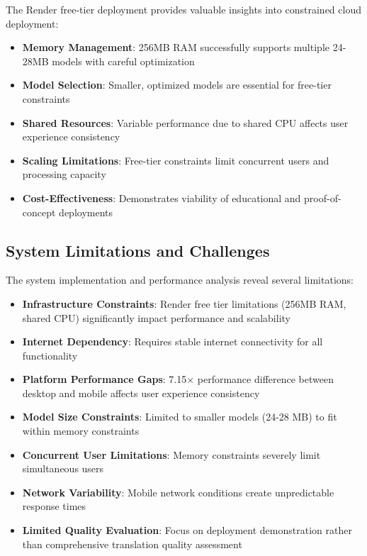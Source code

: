 \documentclass[conference]{IEEEtran}
\begin{document}
The Render free-tier deployment provides valuable insights into constrained cloud deployment:

\begin{itemize}
    \item \textbf{Memory Management}: 256MB RAM successfully supports multiple 24-28MB models with careful optimization
    \item \textbf{Model Selection}: Smaller, optimized models are essential for free-tier constraints
    \item \textbf{Shared Resources}: Variable performance due to shared CPU affects user experience consistency
    \item \textbf{Scaling Limitations}: Free-tier constraints limit concurrent users and processing capacity
    \item \textbf{Cost-Effectiveness}: Demonstrates viability of educational and proof-of-concept deployments
\end{itemize}

\subsection{System Limitations and Challenges}

The system implementation and performance analysis reveal several limitations:

\begin{itemize}
    \item \textbf{Infrastructure Constraints}: Render free tier limitations (256MB RAM, shared CPU) significantly impact performance and scalability
    \item \textbf{Internet Dependency}: Requires stable internet connectivity for all functionality
    \item \textbf{Platform Performance Gaps}: 7.15× performance difference between desktop and mobile affects user experience consistency
    \item \textbf{Model Size Constraints}: Limited to smaller models (24-28 MB) to fit within memory constraints
    \item \textbf{Concurrent User Limitations}: Memory constraints severely limit simultaneous users
    \item \textbf{Network Variability}: Mobile network conditions create unpredictable response times
    \item \textbf{Limited Quality Evaluation}: Focus on deployment demonstration rather than comprehensive translation quality assessment
\end{itemize}
\end{document}
